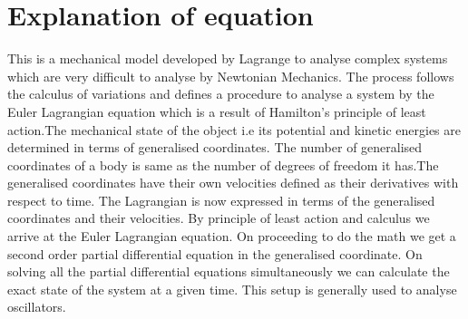 \section{Explanation of equation}
This is a mechanical model developed by Lagrange to analyse complex systems which are very difficult to analyse by Newtonian Mechanics. The process follows the calculus of variations and defines a procedure to analyse a system by the Euler Lagrangian equation which is a result of Hamilton's principle of least action.The mechanical state of the object i.e its potential and kinetic energies are determined in terms of generalised coordinates. The number of generalised coordinates of a body is same as the number of degrees of freedom it has.The generalised coordinates have their own velocities defined as their derivatives with respect to time. The Lagrangian is now expressed in terms of the generalised coordinates and their velocities. By principle of least action and calculus we arrive at the Euler Lagrangian equation. On proceeding to do the math we get a second order partial differential equation in the generalised coordinate. On solving all the partial differential equations simultaneously we can calculate the exact state of the system at a given time. This setup is generally used to analyse oscillators.  




